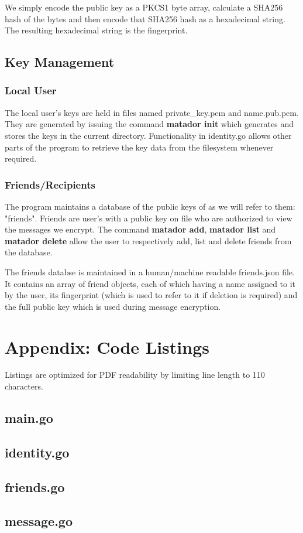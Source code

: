 \documentclass{article}[12pt]
\begin{document}
			We simply encode the public key as a PKCS1 byte array, calculate a SHA256 hash of the bytes and then encode that SHA256 hash as a hexadecimal string. The resulting hexadecimal string is the fingerprint.
			
		\subsection{Key Management}
			\subsubsection{Local User}
				The local user's keys are held in files named private\_key.pem and name.pub.pem. They are generated by issuing the command \textbf{matador init} which generates and stores the keys in the current directory. Functionality in identity.go allows other parts of the program to retrieve the key data from the filesystem whenever required.
				
			\subsubsection{Friends/Recipients}
				The program maintains a database of the public keys of as we will refer to them: "friends". Friends are user's with a public key on file who are authorized to view the messages we encrypt. The command \textbf{matador add}, \textbf{matador list} and \textbf{matador delete} allow the user to respectively add, list and delete friends from the database.
				
				The friends databse is maintained in a human/machine readable friends.json file. It contains an array of friend objects, each of which having a name assigned to it by the user, its fingerprint (which is used to refer to it if deletion is required) and the full public key which is used during message encryption.
			
	\newpage
	
	\section{Appendix: Code Listings}
		Listings are optimized for PDF readability by limiting line length to 110 characters.
		
		\lstset{language=Go}
		\subsection{main.go}
			
		\newpage
		\subsection{identity.go}
			
		\newpage
		\subsection{friends.go}
			
		\newpage
		\subsection{message.go}
			
		\newpage
		
\end{document}
